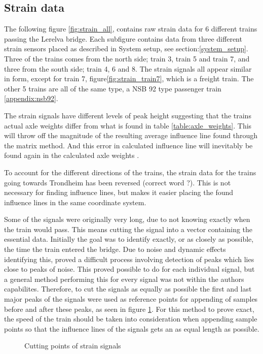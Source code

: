 \subsection{Strain data}
The following figure \ref{fig:strain_all}, contains raw strain data for 6 different trains passing the Lerelva bridge. Each subfigure contains data from three different strain sensors placed as described in System setup, see section:\ref{system_setup}. Three of the trains comes from the north side; train 3, train 5 and train 7, and three from the south side; train 4, 6 and 8. The strain signals all appear similar in form, except for train 7, figure\ref{fig:strain_train7}, which is a freight train. The other 5 trains are all of the same type, a NSB 92 type passenger train \ref{appendix:nsb92}.

The strain signals have different levels of peak height suggesting that the trains actual axle weights differ from what is found in table \ref{table:axle_weights}. This will throw off the magnitude of the resulting average influence line found through the matrix method. And this error in calculated influence line will inevitably be found again in the calculated axle weights \label{peaks_heights}.

To account for the different directions of the trains, the strain data for the trains going towards Trondheim has been reversed (correct word ?). This is not necessary for finding influence lines, but makes it easier placing the found influence lines in the same coordinate system.

Some of the signals were originally very long, due to not knowing exactly when the train would pass. This means cutting the signal into a vector containing the essential data. Initially the goal was to identify exactly, or as closely as possible, the time the train entered the bridge. Due to noise and dynamic effects identifying this, proved a difficult process involving detection of peaks which lies close to peaks of noise. This proved possible to do for each individual signal, but a general method performing this for every signal was not within the authors capabilites. Therefore, to cut the signals as equally as possible the first and last major peaks of the signals were used as reference points for appending of samples before and after these peaks, as seen in figure \ref{fig:cutting_points}. For this method to prove exact, the speed of the train should be taken into consideration when appending sample points so that the influence lines of the signals gets an as equal length as possible.
\begin{figure}[H]
	\begin{adjustbox}{center}
		
	\end{adjustbox}
	\caption{Cutting points of strain signals}
	\label{fig:cutting_points}
\end{figure}

